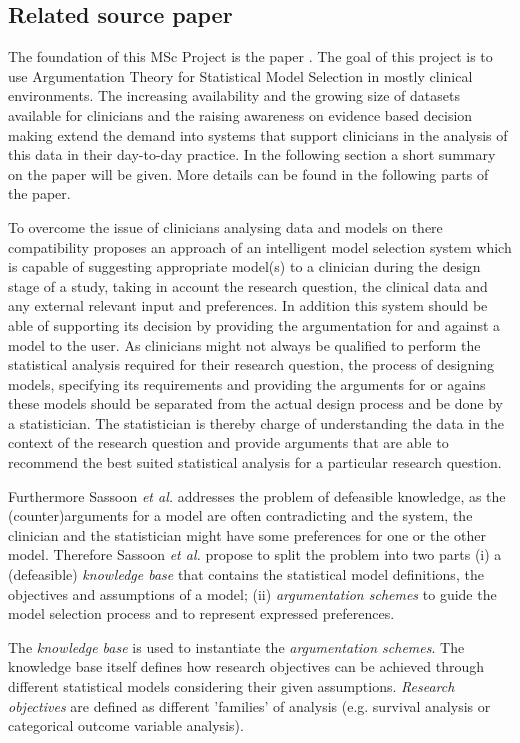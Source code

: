 \subsection{Related source paper}
The foundation of this MSc Project is the paper \cite{sassoon2014}. The goal of this project is to use Argumentation Theory for Statistical Model Selection in mostly clinical environments. The increasing availability and the growing size of datasets available for clinicians and the raising awareness on evidence based decision making extend the demand into systems that support clinicians in the analysis of this data in their day-to-day practice. In the following section a short summary on the paper will be given. More details can be found in the following parts of the paper.

To overcome the issue of clinicians analysing data and models on there compatibility \cite{sassoon2014} proposes an approach of an intelligent model selection system which is capable of suggesting appropriate model(s) to a clinician during the design stage of a study, taking in account the research question, the clinical data and any external relevant input and preferences. In addition this system should be able of supporting its decision by providing the argumentation for and against a model to the user. As clinicians might not always be qualified to perform the statistical analysis required for their research question, the process of designing models, specifying its requirements and providing the arguments for or agains these models should be separated from the actual design process and be done by a statistician. The statistician is thereby  charge of understanding the data in the context of the research question and provide arguments that are able to recommend the best suited statistical analysis for a particular research question. 

Furthermore  Sassoon \textit{et al.} \cite{sassoon2014} addresses the problem of defeasible knowledge, as the (counter)arguments for a model are often contradicting and the system, the clinician and the statistician might have some preferences for one or the other model. Therefore Sassoon \textit{et al.} propose to split the problem into two parts (i) a (defeasible) \textit{knowledge base} that contains the statistical model definitions, the objectives and assumptions of a model; (ii) \textit{argumentation schemes} to guide the model selection process and to represent expressed preferences.

The \textit{knowledge base} is used to instantiate the \textit{argumentation schemes}. The knowledge base itself defines how research objectives can be achieved through different statistical models considering their given assumptions. \textit{Research objectives} are defined as different 'families' of analysis (e.g. survival analysis or categorical outcome variable analysis).


